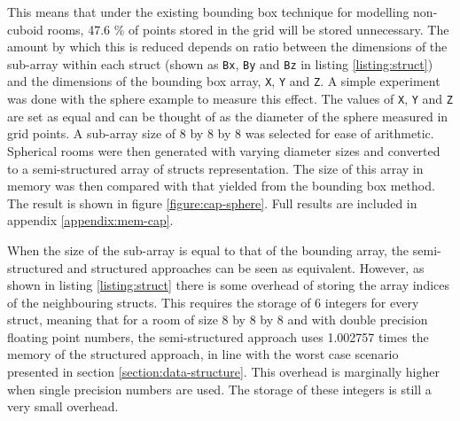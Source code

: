 \documentclass[12pt,a4paper]{report}
\begin{document}
This means that under the existing bounding box technique for modelling non-cuboid rooms, \num{47.6} \% of points stored in the grid will be stored unnecessary. The amount by which this is reduced depends on ratio between the dimensions of the sub-array within each struct (shown as \lstinline|Bx|, \lstinline|By| and \lstinline|Bz| in listing \ref{listing:struct}) and the dimensions of the bounding box array, \lstinline|X|, \lstinline|Y| and \lstinline|Z|. A simple experiment was done with the sphere example to measure this effect. The values of \lstinline|X|, \lstinline|Y| and \lstinline|Z| are set as equal and can be thought of as the diameter of the sphere measured in grid points. A sub-array size of \num{8} by \num{8} by \num{8} was selected for ease of arithmetic. Spherical rooms were then generated with varying diameter sizes and converted to a semi-structured array of structs representation. The size of this array in memory was then compared with that yielded from the bounding box method. The result is shown in figure \ref{figure:cap-sphere}. Full results are included in appendix \ref{appendix:mem-cap}.

When the size of the sub-array is equal to that of the bounding array, the semi-structured and structured approaches can be seen as equivalent. However, as shown in listing \ref{listing:struct}  there is some overhead of storing the array indices of the neighbouring structs. This requires the storage of 6 integers for every struct, meaning that for a room of size \num{8} by \num{8} by \num{8} and with double precision floating point numbers, the semi-structured approach uses \num{1.002757} times the memory of the structured approach, in line with the worst case scenario presented in section \ref{section:data-structure}. This overhead is marginally higher when single precision numbers are used. The storage of these integers is still a very small overhead.
\end{document}
